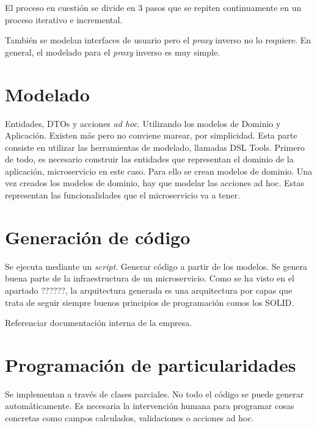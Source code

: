 \documentclass[11pt,spanish,listoffigures]{tfgetsinf}
\begin{document}
El proceso en cuestión se divide en 3 pasos que se repiten continuamente en un proceso iterativo e incremental.

También se modelan interfaces de usuario pero el \emph{proxy} inverso no lo requiere.
En general, el modelado para el \emph{proxy} inverso es muy simple.

	\section{Modelado}

Entidades, DTOs y acciones \emph{ad hoc}.
Utilizando los modelos de Dominio y Aplicación. Existen más pero no conviene marear, por simplicidad. 
Esta parte consiste en utilizar las herramientas de modelado, llamadas DSL Tools. Primero de todo, es necesario construir las entidades que representan el dominio de la aplicación, microservicio en este caso. Para ello se crean modelos de dominio.
Una vez creados los modelos de dominio, hay que modelar las acciones ad hoc. Estas representan las funcionalidades que el microservicio va a tener.

	\section{Generación de código}

Se ejecuta mediante un \emph{script}.
Generar código a partir de los modelos. Se genera buena parte de la infraestructura de un microservicio.
Como se ha visto en el apartado ??????, la arquitectura generada es una arquitectura por capas que trata de seguir siempre buenos principios de programación comos los SOLID.

Referenciar documentación interna de la empresa.

	\section{Programación de particularidades}

Se implementan a través de clases parciales.
No todo el código se puede generar automáticamente. Es necesaria la intervención humana para programar cosas concretas como campos calculados, validaciones o acciones ad hoc.
\end{document}
